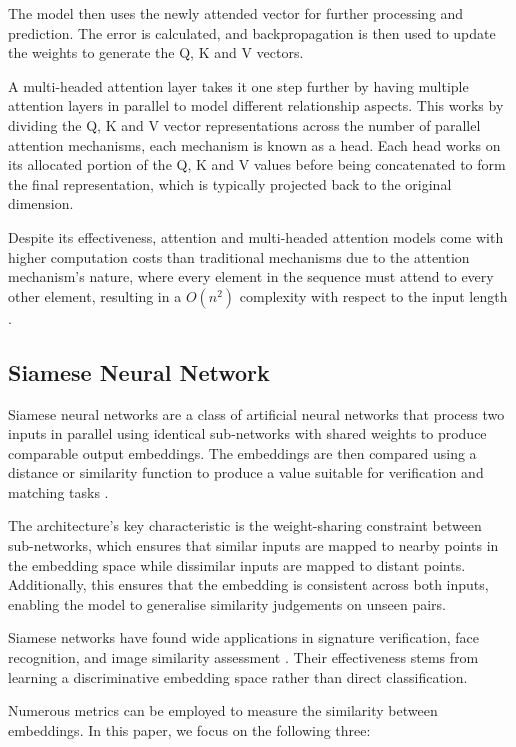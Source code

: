 The model then uses the newly attended vector for further processing and prediction. The error is calculated, and backpropagation is then used to update the weights to generate the Q, K and V vectors.

A multi-headed attention layer takes it one step further by having multiple attention layers in parallel to model different relationship aspects. This works by dividing the Q, K and V vector representations across the number of parallel attention mechanisms, each mechanism is known as a head. Each head works on its allocated portion of the Q, K and V values before being concatenated to form the final representation, which is typically projected back to the original dimension.

Despite its effectiveness, attention and multi-headed attention models come with higher computation costs than traditional mechanisms due to the attention mechanism's nature, where every element in the sequence must attend to every other element, resulting in a $O(n^2)$ complexity with respect to the input length \cite{AttentionComplexity}.



\subsection{Siamese Neural Network} \label{ML:SiameseNetwork}
Siamese neural networks are a class of artificial neural networks that process two inputs in parallel using identical sub-networks with shared weights to produce comparable output embeddings. The embeddings are then compared using a distance or similarity function to produce a value suitable for verification and matching tasks \cite{SiameseModelIntro}.

The architecture's key characteristic is the weight-sharing constraint between sub-networks, which ensures that similar inputs are mapped to nearby points in the embedding space while dissimilar inputs are mapped to distant points. Additionally, this ensures that the embedding is consistent across both inputs, enabling the model to generalise similarity judgements on unseen pairs.

Siamese networks have found wide applications in signature verification, face recognition, and image similarity assessment \cite{SiameseModelSignatureVerification, SiameseFacialRecognition, SiameseImageSimilarity}. Their effectiveness stems from learning a discriminative embedding space rather than direct classification.

Numerous metrics can be employed to measure the similarity between embeddings. In this paper, we focus on the following three:

